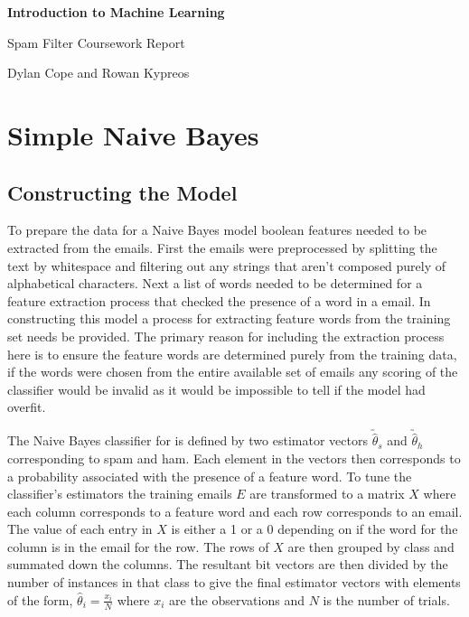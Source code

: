 \documentclass[12pt, a4paper]{article}
\begin{document}
	\begin{center}
	{ \Large \bf Introduction to Machine Learning }

  \end{center}
  \begin{center}
    \vspace{.1in}

    Spam Filter Coursework Report

    Dylan Cope and Rowan Kypreos

	\vspace{.2in}

	\end{center}

  \section{Simple Naive Bayes}

  \subsection{Constructing the Model} \label{classconstr}


  To prepare the data for a Naive Bayes model boolean features needed to be extracted from the emails. First the emails were preprocessed by splitting the text by whitespace and filtering out any strings that aren't composed purely of alphabetical characters. Next a list of words needed to be determined for a feature extraction process that checked the presence of a word in a email. In constructing this model a process for extracting feature words from the training set needs be provided. The primary reason for including the extraction process here is to ensure the feature words are determined purely from the training data, if the words were chosen from the entire available set of emails any scoring of the classifier would be invalid as it would be impossible to tell if the model had overfit.

  The Naive Bayes classifier for is defined by two estimator vectors $\utilde{\hat{\theta}}_s$ and $\utilde{\hat{\theta}}_h$ corresponding to spam and ham. Each element in the vectors then corresponds to a probability associated with the presence of a feature word. To tune the classifier's estimators the training emails $E$ are transformed to a matrix $X$ where each column corresponds to a feature word and each row corresponds to an email. The value of each entry in $X$ is either a 1 or a 0 depending on if the word for the column is in the email for the row. The rows of $X$ are then grouped by class and summated down the columns. The resultant bit vectors are then divided by the number of instances in that class to give the final estimator vectors with elements of the form,
  $ \hat{\theta}_i = \frac{x_i}{N} $
  where $x_i$ are the observations and $N$ is the number of trials.
\end{document}
